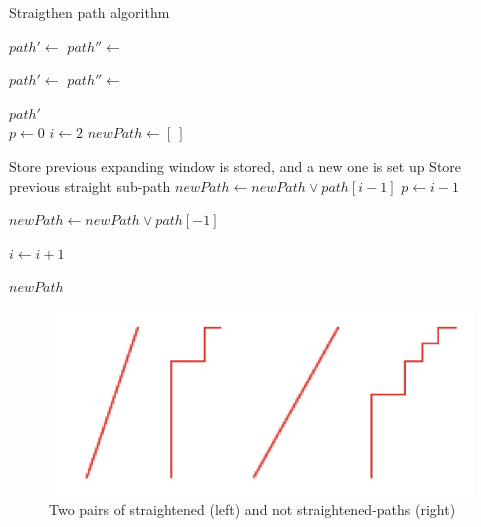 \begin{algorithm}
\caption{Straigthen path algorithm}\label{alg:straigthen-path-algorithm}
\begin{algorithmic}
    \State $path' \gets$ 
    \State $path'' \gets$ 
    
        \State $path' \gets$ 
        \State $path'' \gets$ 
    \EndWhile

    \State \Return $path'$
\EndFunction
\\
    \State $p \gets 0$ 
    \State $i \gets 2$ 
    \State $newPath \gets [\ ]$     

            \LineComment Store previous expanding window is stored, and a new one is set up
            \LineComment Store previous straight sub-path
            \State $newPath \gets newPath \lor path[i - 1]$
            \State $p \gets i - 1$ 
        \EndIf

        \State $newPath \gets newPath \lor path[-1]$

        \State $i \gets i + 1$
    \EndWhile
    
    \State \Return $newPath$
\EndFunction
\end{algorithmic}
\end{algorithm}

\begin{figure}[H]
    \centering
    \includegraphics[width=\columnwidth]{assets/diagonal_path.png} 
    \caption{Two pairs of straightened (left) and not straightened-paths (right)}
    \label{fig:straightened_path}
\end{figure}

